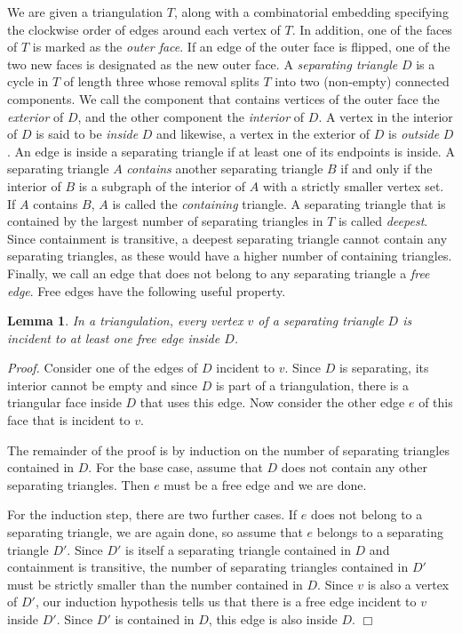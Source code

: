 \pdfoutput=1 \documentclass[12pt]{elsarticle}
\newtheorem{lem}[defin]{Lemma}
\newenvironment{lemma}{\begin{lem} \sl}{\end{lem}}
\newenvironment{proof}{\emph{Proof.}}{\hfill $\Box$ \medskip\\}
\begin{document}
We are given a triangulation $T$, along with a combinatorial embedding specifying the clockwise order of edges around each vertex of $T$. In addition, one of the faces of $T$ is marked as the \emph{outer face}. If an edge of the outer face is flipped, one of the two new faces is designated as the new outer face. A \emph{separating triangle} $D$ is a cycle in $T$ of length three whose removal splits $T$ into two (non-empty) connected components. We call the component that contains vertices of the outer face the \emph{exterior} of $D$, and the other component the \emph{interior} of $D$. A vertex in the interior of $D$ is said to be \emph{inside} $D$ and likewise, a vertex in the exterior of $D$ is \emph{outside} $D$. An edge is inside a separating triangle if at least one of its endpoints is inside. A separating triangle $A$ \emph{contains} another separating triangle $B$ if and only if the interior of $B$ is a subgraph of the interior of $A$ with a strictly smaller vertex set. If $A$ contains $B$, $A$ is called the \emph{containing} triangle. A separating triangle that is contained by the largest number of separating triangles in $T$ is called \emph{deepest}. Since containment is transitive, a deepest separating triangle cannot contain any separating triangles, as these would have a higher number of containing triangles. Finally, we call an edge that does not belong to any separating triangle a \emph{free edge}. Free edges have the following useful property.

\begin{lemma}
 \label{lem:freeedge}
 In a triangulation, every vertex $v$ of a separating triangle $D$ is incident to at least one free edge inside $D$.
\end{lemma}
\begin{proof}
 Consider one of the edges of $D$ incident to $v$. Since $D$ is separating, its interior cannot be empty and since $D$ is part of a triangulation, there is a triangular face inside $D$ that uses this edge. Now consider the other edge $e$ of this face that is incident to $v$.

 The remainder of the proof is by induction on the number of separating triangles contained in $D$. For the base case, assume that $D$ does not contain any other separating triangles. Then $e$ must be a free edge and we are done.

 For the induction step, there are two further cases. If $e$ does not belong to a separating triangle, we are again done, so assume that $e$ belongs to a separating triangle $D'$. Since $D'$ is itself a separating triangle contained in $D$ and containment is transitive, the number of separating triangles contained in $D'$ must be strictly smaller than the number contained in $D$. Since $v$ is also a vertex of $D'$, our induction hypothesis tells us that there is a free edge incident to $v$ inside $D'$. Since $D'$ is contained in $D$, this edge is also inside $D$.
\end{proof}
\end{document}
